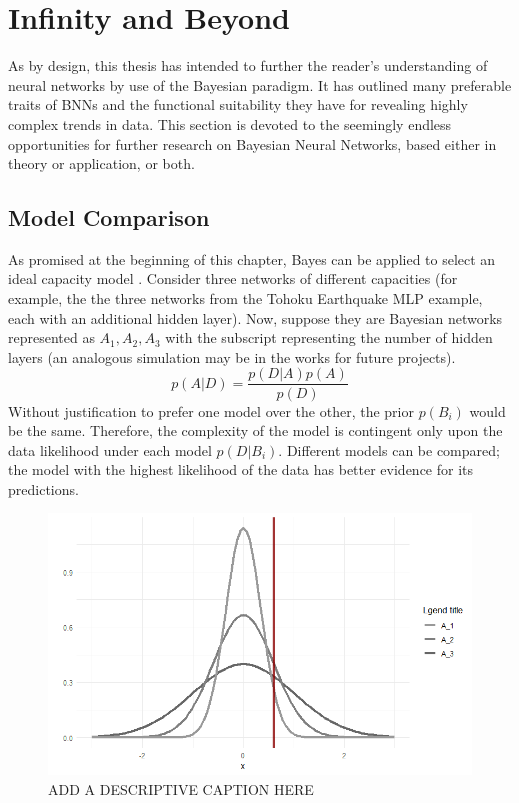







\section{Infinity and Beyond}

As by design, this thesis has intended to further the reader's understanding of neural networks by use of the Bayesian paradigm.  It has outlined many preferable traits of BNNs and the functional suitability they have for revealing highly complex trends in data.
This section is devoted to the seemingly endless opportunities for further research on Bayesian Neural Networks, based either in theory or application, or both.

\subsection{Model Comparison}
As promised at the beginning of this chapter, Bayes can be applied to select an ideal capacity model \cite{bishop1997bayesian}.  Consider three networks of different capacities (for example, the the three networks from the Tohoku Earthquake MLP example, each with an additional hidden layer).  Now, suppose they are Bayesian networks represented as $A_1, A_2, A_3$ with the subscript representing the number of hidden layers (an analogous simulation may be in the works for future projects).
$$
p(A|D) = \frac{p(D|A)p(A)}{p(D)}
$$
Without justification to prefer one model over the other, the prior $p(B_i)$ would be the same.  Therefore, the complexity of the model is contingent only upon the data likelihood under each model $p(D|B_i)$.  Different models can be compared; the model with the highest likelihood of the data has better evidence for its predictions.

\begin{figure}[H]
    \centering
    \includegraphics[width = .6\textwidth]{Figures/BNN_modelcheck.png}
    \caption{\footnotesize{ADD A DESCRIPTIVE CAPTION HERE}}
    \label{BNNmodelcheck}
\end{figure}

